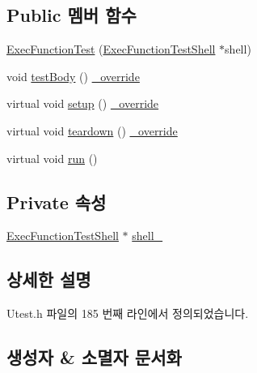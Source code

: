 \subsection*{Public 멤버 함수}
\begin{DoxyCompactItemize}
\item 
\hyperlink{class_exec_function_test_a190d6f4538655bf9e1a2ea977860ada6}{Exec\+Function\+Test} (\hyperlink{class_exec_function_test_shell}{Exec\+Function\+Test\+Shell} $\ast$shell)
\item 
void \hyperlink{class_exec_function_test_a0ef860ddf4b5962b0b91afaf40635405}{test\+Body} () \hyperlink{_cpp_u_test_config_8h_a049bea15dd750e15869863c94c1efc3b}{\+\_\+override}
\item 
virtual void \hyperlink{class_exec_function_test_a761f4647ca01c5ef918c9920fc00d903}{setup} () \hyperlink{_cpp_u_test_config_8h_a049bea15dd750e15869863c94c1efc3b}{\+\_\+override}
\item 
virtual void \hyperlink{class_exec_function_test_ac1ce51163058ebe9ef1daa61f97a7f49}{teardown} () \hyperlink{_cpp_u_test_config_8h_a049bea15dd750e15869863c94c1efc3b}{\+\_\+override}
\item 
virtual void \hyperlink{class_utest_a13a43e6d814de94978c515cb084873b1}{run} ()
\end{DoxyCompactItemize}
\subsection*{Private 속성}
\begin{DoxyCompactItemize}
\item 
\hyperlink{class_exec_function_test_shell}{Exec\+Function\+Test\+Shell} $\ast$ \hyperlink{class_exec_function_test_afdceb680dc32abae41e3755374a67cea}{shell\+\_\+}
\end{DoxyCompactItemize}


\subsection{상세한 설명}


Utest.\+h 파일의 185 번째 라인에서 정의되었습니다.



\subsection{생성자 \& 소멸자 문서화}
